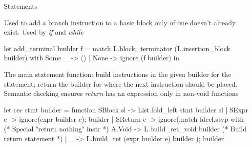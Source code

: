 \documentclass{plt}
\begin{document}
\begin{frame}[fragile=singleslide]{Statements}

Used to add a branch instruction to a basic block only of one doesn't
already exist.  Used by \emph{if} and \emph{while}

\begin{ocaml}
let add_terminal builder f =
  match L.block_terminator (L.insertion_block builder) with
    Some _ -> ()
  | None -> ignore (f builder) in
\end{ocaml}

The main statement function: build instructions in the given builder
for the statement; return the builder for where the next instruction
should be placed.  Semantic checking ensures \emph{return} has an
expression only in non-void functions

\begin{ocaml}
let rec stmt builder = function
    SBlock sl -> List.fold_left stmt builder sl
  | SExpr e   -> ignore(expr builder e); builder 
  | SReturn e -> ignore(match fdecl.styp with
                          (* Special "return nothing" instr *)
                          A.Void -> L.build_ret_void builder 
                          (* Build return statement *)
                        | _ -> L.build_ret (expr builder e) builder );
                 builder
\end{ocaml}
\end{frame}
\end{document}
